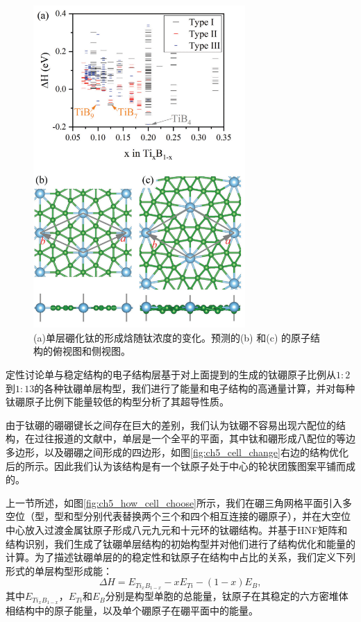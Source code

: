 \begin{figure}
  \includegraphics[width=0.72\textwidth]{figs/ch5_energy_hull.png}
  \centering
  \caption{(a)单层硼化钛的形成焓随钛浓度的变化。预测的(b) 和(c) 的原子结构的俯视图和侧视图。}
  \label{fig:ch5_energy_hull}
\end{figure}

定性讨论单与稳定结构的电子结构层基于对上面提到的生成的钛硼原子比例从$1:2$到$1:13$的各种钛硼单层构型，我们进行了能量和电子结构的高通量计算，并对每种钛硼原子比例下能量较低的构型分析了其超导性质。

由于钛硼的硼硼键长之间存在巨大的差别，我们认为钛硼不容易出现六配位的结构，在过往报道的文献中，单层是一个全平的平面，其中钛和硼形成八配位的等边多边形，以及硼硼之间形成的四边形，如图\ref{fig:ch5_cell_change}右边的结构优化后的所示。因此我们认为该结构是有一个钛原子处于中心的轮状团簇图案平铺而成的。

上一节所述，如图\ref{fig:ch5_how_cell_choose}所示，我们在硼三角网格平面引入多空位（型，型和型分别代表替换两个三个和四个相互连接的硼原子），并在大空位中心放入过渡金属钛原子形成八元九元和十元环的钛硼结构。并基于HNF矩阵和结构识别，我们生成了钛硼单层结构的初始构型并对他们进行了结构优化和能量的计算。为了描述钛硼单层的的稳定性和钛原子在结构中占比的关系，我们定义下列形式的单层构型形成能：
\begin{equation}
  \Delta H = E_{Ti_xB_{1-x}} - xE_{Ti} - (1-x)E_{B},
\end{equation}
其中$E_{Ti_xB_{1-x}}$，$E_{Ti}$和$E_B$分别是构型单胞的总能量，钛原子在其稳定的六方密堆体相结构中的原子能量，以及单个硼原子在硼平面中的能量。

